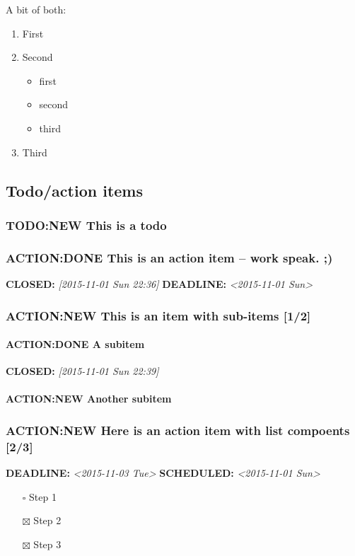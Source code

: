 \documentclass[11pt]{article}
\begin{document}
A bit of both:

\begin{enumerate}
\item First
\item Second
\begin{itemize}
\item first
\item second
\item third
\end{itemize}
\item Third
\end{enumerate}

\subsection{Todo/action items}
\label{sec:org4f63d53}

\subsubsection{{\bfseries\sffamily TODO:NEW} This is a todo}
\label{sec:org16f0b8e}

\subsubsection{ACTION:DONE This is an action item -- work speak. ;)}
\label{sec:org22f8adf}
\noindent\textbf{CLOSED:} \textit{[2015-11-01 Sun 22:36] } \textbf{DEADLINE:} \textit{<2015-11-01 Sun>}\\

\subsubsection{ACTION:NEW This is an item with sub-items [1/2]}
\label{sec:orge7f1aca}
\paragraph{ACTION:DONE A subitem}
\label{sec:org7dc74e3}
\noindent\textbf{CLOSED:} \textit{[2015-11-01 Sun 22:39]}\\
\paragraph{ACTION:NEW Another subitem}
\label{sec:org92af14c}

\subsubsection{ACTION:NEW Here is an action item with list compoents [2/3]}
\label{sec:orgebcfa61}
\noindent\textbf{DEADLINE:} \textit{<2015-11-03 Tue> } \textbf{SCHEDULED:} \textit{<2015-11-01 Sun>}\\
\begin{itemize}
\item[{$\square$}] Step 1
\item[{$\boxtimes$}] Step 2
\item[{$\boxtimes$}] Step 3
\end{itemize}
\end{document}
